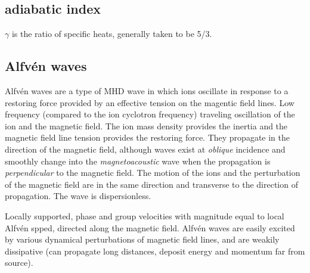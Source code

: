 \documentclass{article}
\begin{document}
\subsection{adiabatic index}
$\gamma$ is the ratio of specific heats, generally taken to be 5/3.

\subsection{Alfv\'en waves}
Alfv\'en waves are a type of MHD wave in which ions oscillate in response to a
restoring force provided by an effective tension on the magentic field lines.
Low frequency (compared to the ion cyclotron frequency) traveling
oscillation of the ion and the magnetic field. The ion mass
density provides the inertia and the magnetic field line
tension provides the restoring force.
They propagate in the direction of the magnetic field, although waves exist
at \emph{oblique} incidence and smoothly change into the \emph{magnetoacoustic}
wave when the propagation is \emph{perpendicular} to the magnetic field.
The motion of the ions and the perturbation of the magnetic
field are in the same direction and transverse to the direction of
propagation. The wave is dispersionless.

Locally supported, phase and group velocities with magnitude equal to
local Alfv\'en spped, directed along the magnetic field.
Alfv\'en waves are easily excited by various dynamical perturbations of
magnetic field lines, and are
weakily dissipative (can propagate long distances, deposit energy
and momentum far from source).
\end{document}
